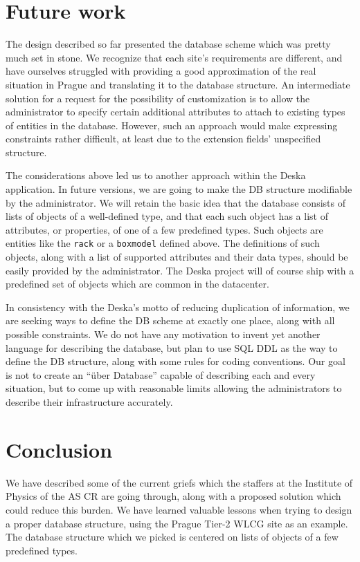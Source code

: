 \documentclass[11pt]{article}
\begin{document}
\section{Future work}

The design described so far presented the database scheme which was pretty much
set in stone.  We recognize that each site's requirements are different, and
have ourselves struggled with providing a good approximation of the real
situation in Prague and translating it to the database structure.  An
intermediate solution for a request for the possibility of customization is to
allow the administrator to specify certain additional attributes to attach to
existing types of entities in the database.  However, such an approach would
make expressing constraints rather difficult, at least due to the extension
fields' unspecified structure.

The considerations above led us to another approach within the Deska
application.  In future versions, we are going to make the DB structure
modifiable by the administrator.  We will retain the basic idea that the
database consists of lists of objects of a well-defined type, and that each such
object has a list of attributes, or properties, of one of a few predefined
types.  Such objects are entities like the {\tt rack} or a {\tt boxmodel}
defined above.  The definitions of such objects, along with a list of supported
attributes and their data types, should be easily provided by the administrator.
The Deska project will of course ship with a predefined set of objects which are
common in the datacenter.

In consistency with the Deska's motto of reducing duplication of information, we
are seeking ways to define the DB scheme at exactly one place, along with all
possible constraints.  We do not have any motivation to invent yet another
language for describing the database, but plan to use SQL DDL as the way to
define the DB structure, along with some rules for coding conventions.  Our goal
is not to create an ``über Database'' capable of describing each and every
situation, but to come up with reasonable limits allowing the administrators to
describe their infrastructure accurately.

\section{Conclusion}

We have described some of the current griefs which the staffers at the Institute
of Physics of the AS CR are going through, along with a proposed solution which
could reduce this burden.  We have learned valuable lessons when trying to
design a proper database structure, using the Prague Tier-2 WLCG site as an
example.  The database structure which we picked is centered on lists of objects
of a few predefined types.
\end{document}
